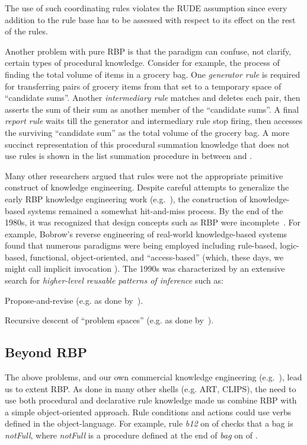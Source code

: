 \documentclass[twocolumn,global]{sys/svjour}
\begin{document}
The use of such coordinating rules violates the RUDE assumption since
every addition to the rule base has to be assessed with respect to
its effect on the rest of the rules.

Another problem with pure RBP is that the paradigm can confuse, not
clarify, certain types of procedural knowledge. Consider for example,
the process of finding the total volume of items in a grocery bag.
One {\em generator rule} is required for transferring pairs of
grocery items from that set to a temporary space of ``candidate
sums''. Another {\em intermediary rule} matches and deletes each
pair, then asserts the sum of their sum as another member of the
``candidate sums''. A final {\em report rule} waits till the
generator and intermediary rule stop firing, then accesses the
surviving ``candidate sum'' as the total volume of the grocery bag. A
more succinct representation of this procedural summation knowledge
that does not use rules is shown in the list summation procedure in
 between  and .


Many other researchers argued that rules were not the appropriate
primitive construct of knowledge engineering. Despite careful
attempts to generalize the early RBP knowledge engineering work
(e.g.~\cite{stefik82}), the construction of knowledge-based systems
remained a somewhat hit-and-miss process. By the end of the 1980s, it
was recognized that  design concepts such as RBP were
incomplete~\cite{bucsmi89}. For example, Bobrow's reverse engineering
of real-world knowledge-based systems~\cite{bobrow85} found that
numerous paradigms were being employed including rule-based,
logic-based, functional, object-oriented, and ``access-based''
(which, these days, we might call implicit invocation \cite{shaw96}).
The 1990s was characterized by an extensive search for {\em
higher-level reusable patterns of inference } such as: \bi \item
Propose-and-revise (e.g. as done by~\cite{sch94}). \item Recursive
descent of ``problem spaces'' (e.g. as done \newline
by~\cite{yost93}). \ei

\subsection{Beyond RBP}

The above problems, and our own commercial knowledge engineering
(e.g.~\cite{men87a,mebfd92}), lead us to extent RBP. As done in many
other shells (e.g. ART, CLIPS), the need to use both procedural and
declarative rule knowledge made us combine RBP with a simple
object-oriented approach. Rule conditions and actions could use verbs
defined in the object-language. For example, rule {\em b12} on
 of  checks that a bag
is {\em notFull}, where {\em notFull} is a procedure defined at the
end of {\em bag} on  of .
\end{document}
